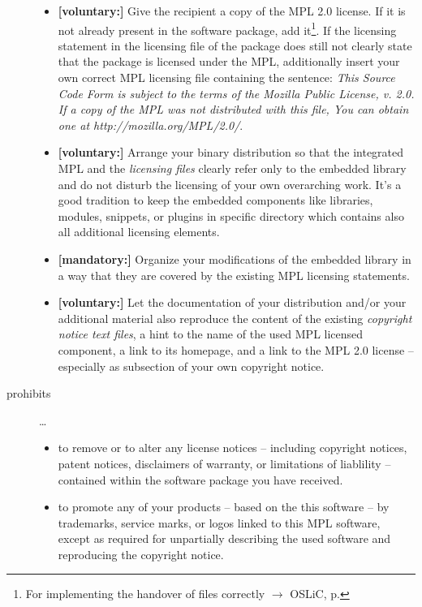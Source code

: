 \begin{description}
\begin{itemize}
  \item \textbf{[voluntary:]} Give the recipient a copy of the MPL 2.0 license.
  If it is not already present in the software package, add it\footnote{For
  implementing the handover of files correctly $\rightarrow$ OSLiC, p.
  \pageref{DistributingFilesHint}}. If the licensing statement in the licensing
  file of the package does still not clearly state that the package is licensed
  under the MPL, additionally insert your own correct MPL licensing file
  containing the sentence: \emph{This Source Code Form is subject to the terms
  of the Mozilla Public License, v. 2.0. If a copy of the MPL was not
  distributed with this file, You can obtain one at
  http://mozilla.org/MPL/2.0/}.

  \item \textbf{[voluntary:]} Arrange your binary distribution so that the
  integrated MPL and the \emph{licensing files} clearly refer only to the
  embedded library and do not disturb the licensing of your own overarching
  work. It's a good tradition to keep the embedded components like libraries,
  modules, snippets, or plugins in specific directory which contains also all
  additional licensing elements.
  
  \item \textbf{[mandatory:]} Organize your modifications of the embedded
  library in a way that they are covered by the existing MPL licensing
  statements. 
  
  \item \textbf{[voluntary:]} Let the documentation of your distribution and/or
  your additional material  also reproduce the content of the existing
  \emph{copyright notice text files}, a hint to the name of the used MPL
  licensed component, a link to its homepage, and a link to the MPL 2.0 license
  -- especially as subsection of your own copyright notice.
  
\end{itemize}

\item[prohibits] \ldots
\begin{itemize}
  \item to remove or to alter any license notices -- including copyright
  notices, patent notices, disclaimers of warranty, or limitations of liablility
  -- contained within the software package you have received.
  \item to promote any of your products -- based on the this software -- by
  trademarks, service marks, or logos linked to this MPL software, except as
  required for unpartially describing the used software and reproducing the
  copyright notice.
\end{itemize}

\end{description}

